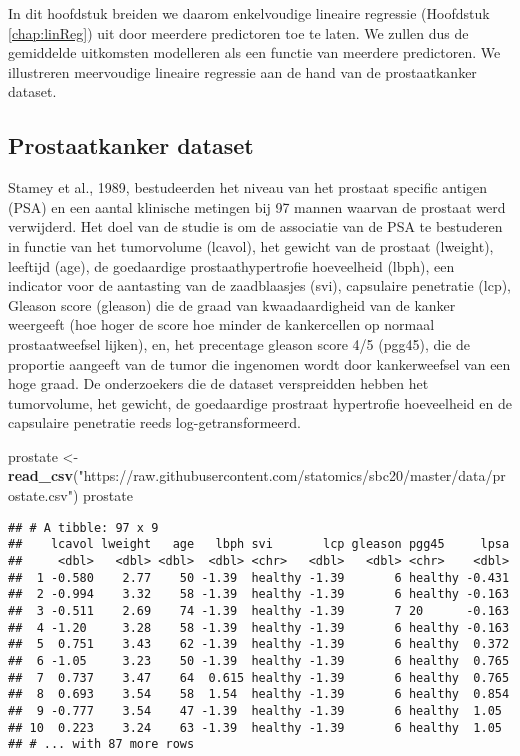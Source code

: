 \documentclass[
  12pt,dutch,coursenotes]{book}
\newenvironment{Shaded}{\begin{snugshade}}{\end{snugshade}}
\newcommand{\KeywordTok}[1]{\textcolor[rgb]{0.13,0.29,0.53}{\textbf{#1}}}
\newcommand{\NormalTok}[1]{#1}
\newcommand{\StringTok}[1]{\textcolor[rgb]{0.31,0.60,0.02}{#1}}
\theoremstyle{definition}
\theoremstyle{definition}
\theoremstyle{definition}
\theoremstyle{remark}
\begin{document}
In dit hoofdstuk breiden we daarom enkelvoudige lineaire regressie (Hoofdstuk \ref{chap:linReg}) uit door meerdere predictoren toe te laten. We zullen dus de gemiddelde uitkomsten modelleren als een functie van meerdere predictoren.
We illustreren meervoudige lineaire regressie aan de hand van de prostaatkanker dataset.

\hypertarget{sec:prostate}{%
\subsection{Prostaatkanker dataset}\label{sec:prostate}}

Stamey et al., 1989, bestudeerden het niveau van het prostaat specific antigen (PSA) en een aantal klinische metingen bij 97 mannen waarvan de prostaat werd verwijderd.
Het doel van de studie is om de associatie van de PSA te bestuderen in functie van het tumorvolume (lcavol), het gewicht van de prostaat (lweight), leeftijd (age), de goedaardige prostaathypertrofie hoeveelheid (lbph), een indicator voor de aantasting van de zaadblaasjes (svi), capsulaire penetratie (lcp), Gleason score (gleason) die de graad van kwaadaardigheid van de kanker weergeeft (hoe hoger de score hoe minder de kankercellen op normaal prostaatweefsel lijken), en, het precentage gleason score 4/5 (pgg45), die de proportie aangeeft van de tumor die ingenomen wordt door kankerweefsel van een hoge graad. De onderzoekers die de dataset verspreidden hebben het tumorvolume, het gewicht, de goedaardige prostraat hypertrofie hoeveelheid en de capsulaire penetratie reeds log-getransformeerd.

\begin{Shaded}
\begin{Highlighting}[]
\NormalTok{prostate \textless{}{-}}\StringTok{ }\KeywordTok{read\_csv}\NormalTok{(}\StringTok{"https://raw.githubusercontent.com/statomics/sbc20/master/data/prostate.csv"}\NormalTok{)}
\NormalTok{prostate}
\end{Highlighting}
\end{Shaded}

\begin{verbatim}
## # A tibble: 97 x 9
##    lcavol lweight   age   lbph svi       lcp gleason pgg45     lpsa
##     <dbl>   <dbl> <dbl>  <dbl> <chr>   <dbl>   <dbl> <chr>    <dbl>
##  1 -0.580    2.77    50 -1.39  healthy -1.39       6 healthy -0.431
##  2 -0.994    3.32    58 -1.39  healthy -1.39       6 healthy -0.163
##  3 -0.511    2.69    74 -1.39  healthy -1.39       7 20      -0.163
##  4 -1.20     3.28    58 -1.39  healthy -1.39       6 healthy -0.163
##  5  0.751    3.43    62 -1.39  healthy -1.39       6 healthy  0.372
##  6 -1.05     3.23    50 -1.39  healthy -1.39       6 healthy  0.765
##  7  0.737    3.47    64  0.615 healthy -1.39       6 healthy  0.765
##  8  0.693    3.54    58  1.54  healthy -1.39       6 healthy  0.854
##  9 -0.777    3.54    47 -1.39  healthy -1.39       6 healthy  1.05 
## 10  0.223    3.24    63 -1.39  healthy -1.39       6 healthy  1.05 
## # ... with 87 more rows
\end{verbatim}
\end{document}
